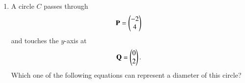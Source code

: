 \documentclass[journal,12pt,twocolumn]{IEEEtran}
\begin{document}
\begin{enumerate}[label=\arabic*]
\item A circle $C$ passes through 
\begin{equation} 
\mathbf{P}=\begin{pmatrix}-2\\ 4\end{pmatrix} 
\label{eq:circle_7_p}
\end{equation} 
and touches the $y$-axis at 
\begin{equation} 
\mathbf{Q}=\begin{pmatrix}0\\ 2\end{pmatrix}. 
\label{eq:circle_7_q}
\end{equation}
Which one of the  following equations can represent a diameter of this circle?
\begin{enumerate}[label=(\roman*)]
\end{enumerate}


\end{enumerate}
\end{document}
